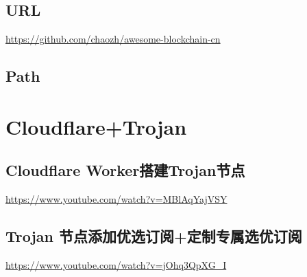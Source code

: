 \documentclass[11pt]{article}
\begin{document}
\subsection{URL}
\label{sec:orgf261783}
\url{https://github.com/chaozh/awesome-blockchain-cn}
\subsection{Path}
\label{sec:org2a6e926}
\section{Cloudflare+Trojan}
\label{sec:org4b77d32}
\subsection{Cloudflare Worker搭建Trojan节点}
\label{sec:org814168c}
\url{https://www.youtube.com/watch?v=MBlAqYajVSY}
\subsection{Trojan 节点添加优选订阅+定制专属选优订阅}
\label{sec:org716d133}
\url{https://www.youtube.com/watch?v=jOhq3QpXG\_I}
\end{document}
